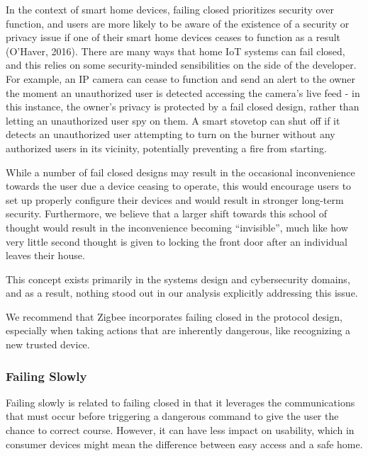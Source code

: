  In the context of smart home devices, failing closed prioritizes security over function, and users are more likely to be aware of the existence of a security or privacy issue if one of their smart home devices ceases to function as a result (O’Haver, 2016). There are many ways that home IoT systems can fail closed, and this relies on some security-minded sensibilities on the side of the developer. For example, an IP camera can cease to function and send an alert to the owner the moment an unauthorized user is detected accessing the camera’s live feed - in this instance, the owner’s privacy is protected by a fail closed design, rather than letting an unauthorized user spy on them. A smart stovetop can shut off if it detects an unauthorized user attempting to turn on the burner without any authorized users in its vicinity, potentially preventing a fire from starting.

While a number of fail closed designs may result in the occasional inconvenience towards the user due a device ceasing to operate, this would encourage users to set up properly configure their devices and would result in stronger long-term security. Furthermore, we believe that a larger shift towards this school of thought would result in the inconvenience becoming “invisible”, much like how very little second thought is given to locking the front door after an individual leaves their house.

 This concept exists primarily in the systems design and cybersecurity domains, and as a result, nothing stood out in our analysis explicitly addressing this issue.

 We recommend that Zigbee incorporates failing closed in the protocol design, especially when taking actions that are inherently dangerous, like recognizing a new trusted device. 

\subsubsection{Failing Slowly}
Failing slowly is related to failing closed in that it leverages the communications that must occur before triggering a dangerous command to give the user the chance to correct course. However, it can have less impact on usability, which in consumer devices might mean the difference between easy access and a safe home.


